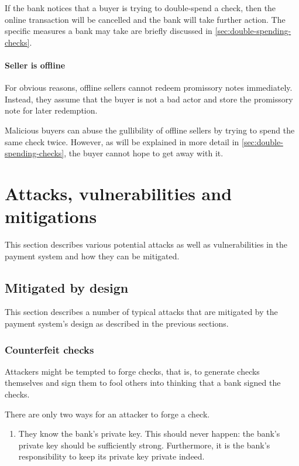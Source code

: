 \documentclass[12pt,a4paper]{article}
\begin{document}
\begin{multicols}{2}
	If the bank notices that a buyer is trying to double-spend a check, then the online transaction will be cancelled and the bank will take further action. The specific measures a bank may take are briefly discussed in \autoref{sec:double-spending-checks}.
	
	\paragraph{Seller is offline}
	
	For obvious reasons, offline sellers cannot redeem promissory notes immediately. Instead, they assume that the buyer is not a bad actor and store the promissory note for later redemption.

	Malicious buyers can abuse the gullibility of offline sellers by trying to spend the same check twice. However, as will be explained in more detail in \autoref{sec:double-spending-checks}, the buyer cannot hope to get away with it.

	\section{Attacks, vulnerabilities and mitigations}

	This section describes various potential attacks as well as vulnerabilities in the payment system and how they can be mitigated.
	
	\subsection{Mitigated by design}
	
	This section describes a number of typical attacks that are mitigated by the payment system's design as described in the previous sections.

	\subsubsection{Counterfeit checks}

	Attackers might be tempted to forge checks, that is, to generate checks themselves and sign them to fool others into thinking that a bank signed the checks.
	
	There are only two ways for an attacker to forge a check.
	
	\begin{enumerate}
		\item They know the bank's private key. This should never happen: the bank's private key should be sufficiently strong. Furthermore, it is the bank's responsibility to keep its private key private indeed.
		

\end{enumerate}
\end{multicols}
\end{document}
